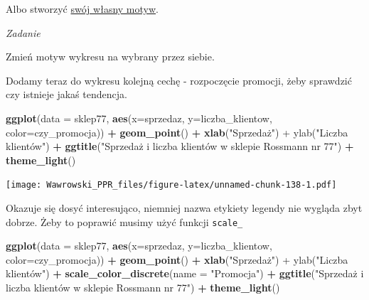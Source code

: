 \documentclass[]{book}
\newenvironment{Shaded}{\begin{snugshade}}{\end{snugshade}}
\newcommand{\KeywordTok}[1]{\textcolor[rgb]{0.13,0.29,0.53}{\textbf{#1}}}
\newcommand{\DataTypeTok}[1]{\textcolor[rgb]{0.13,0.29,0.53}{#1}}
\newcommand{\StringTok}[1]{\textcolor[rgb]{0.31,0.60,0.02}{#1}}
\newcommand{\OperatorTok}[1]{\textcolor[rgb]{0.81,0.36,0.00}{\textbf{#1}}}
\newcommand{\NormalTok}[1]{#1}
\begin{document}
Albo stworzyć
\href{https://www.statworx.com/de/blog/custom-themes-in-ggplot2/}{swój
własny motyw}.

\emph{Zadanie}

Zmień motyw wykresu na wybrany przez siebie.

Dodamy teraz do wykresu kolejną cechę - rozpoczęcie promocji, żeby
sprawdzić czy istnieje jakaś tendencja.

\begin{Shaded}
\begin{Highlighting}[]
\KeywordTok{ggplot}\NormalTok{(}\DataTypeTok{data =}\NormalTok{ sklep77, }\KeywordTok{aes}\NormalTok{(}\DataTypeTok{x=}\NormalTok{sprzedaz, }\DataTypeTok{y=}\NormalTok{liczba_klientow, }\DataTypeTok{color=}\NormalTok{czy_promocja)) }\OperatorTok{+}
\StringTok{  }\KeywordTok{geom_point}\NormalTok{() }\OperatorTok{+}
\StringTok{  }\KeywordTok{xlab}\NormalTok{(}\StringTok{"Sprzedaż") +}
\StringTok{  ylab("}\NormalTok{Liczba klientów") }\OperatorTok{+}
\StringTok{  }\KeywordTok{ggtitle}\NormalTok{(}\StringTok{"Sprzedaż i liczba klientów w sklepie Rossmann nr 77"}\NormalTok{) }\OperatorTok{+}
\StringTok{  }\KeywordTok{theme_light}\NormalTok{()}
\end{Highlighting}
\end{Shaded}

\texttt{[image: Wawrowski\_PPR\_files/figure-latex/unnamed-chunk-138-1.pdf]}

Okazuje się dosyć interesująco, niemniej nazwa etykiety legendy nie
wygląda zbyt dobrze. Żeby to poprawić musimy użyć funkcji
\texttt{scale\_}

\begin{Shaded}
\begin{Highlighting}[]
\KeywordTok{ggplot}\NormalTok{(}\DataTypeTok{data =}\NormalTok{ sklep77, }\KeywordTok{aes}\NormalTok{(}\DataTypeTok{x=}\NormalTok{sprzedaz, }\DataTypeTok{y=}\NormalTok{liczba_klientow, }\DataTypeTok{color=}\NormalTok{czy_promocja)) }\OperatorTok{+}
\StringTok{  }\KeywordTok{geom_point}\NormalTok{() }\OperatorTok{+}
\StringTok{  }\KeywordTok{xlab}\NormalTok{(}\StringTok{"Sprzedaż") +}
\StringTok{  ylab("}\NormalTok{Liczba klientów") }\OperatorTok{+}
\StringTok{  }\KeywordTok{scale_color_discrete}\NormalTok{(}\DataTypeTok{name =} \StringTok{"Promocja"}\NormalTok{) }\OperatorTok{+}
\StringTok{  }\KeywordTok{ggtitle}\NormalTok{(}\StringTok{"Sprzedaż i liczba klientów w sklepie Rossmann nr 77"}\NormalTok{) }\OperatorTok{+}
\StringTok{  }\KeywordTok{theme_light}\NormalTok{()}
\end{Highlighting}
\end{Shaded}
\end{document}
